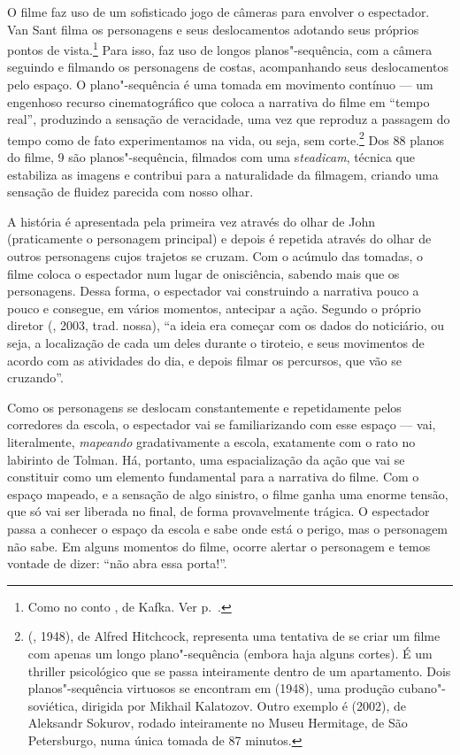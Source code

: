 O filme faz uso de um sofisticado jogo de câmeras para envolver o
espectador. Van Sant filma os personagens e seus deslocamentos adotando
seus próprios pontos de vista.\footnote{Como no conto {}, de Kafka. Ver p.~\pageref{construcao}.} Para isso, faz uso
de longos planos"-sequência, com a câmera seguindo e filmando os
personagens de costas, acompanhando seus deslocamentos pelo espaço. O
plano"-sequência é uma tomada em movimento contínuo --- um engenhoso
recurso cinematográfico que coloca a narrativa do filme em ``tempo
real'', produzindo a sensação de veracidade, uma vez que reproduz a
passagem do tempo como de fato experimentamos na vida, ou seja, sem
corte.\footnote{{} ({}, 1948), de Alfred
  Hitchcock, representa uma tentativa de se criar um filme com apenas um
  longo plano"-sequência (embora haja alguns cortes). É um
  thriller psicológico que se passa inteiramente dentro de um
  apartamento. Dois planos"-sequência virtuosos se encontram em {} (1948), uma produção cubano"-soviética, dirigida por Mikhail
  Kalatozov. Outro exemplo é {} (2002), de Aleksandr
  Sokurov, rodado inteiramente no Museu Hermitage, de São Petersburgo,
  numa única tomada de 87 minutos.} Dos 88 planos do filme, 9 são
planos"-sequência, filmados com uma s\emph{teadicam}, técnica que
estabiliza as imagens e contribui para a naturalidade da filmagem,
criando uma sensação de fluidez parecida com nosso olhar.

A história é apresentada pela primeira vez através do olhar de John
(praticamente o personagem principal) e depois é repetida através do
olhar de outros personagens cujos trajetos se cruzam. Com o acúmulo das
tomadas, o filme coloca o espectador num lugar de onisciência, sabendo
mais que os personagens. Dessa forma, o espectador vai construindo a
narrativa pouco a pouco e consegue, em vários momentos, antecipar a
ação. Segundo o próprio diretor (, 2003, trad. nossa), ``a ideia
era começar com os dados do noticiário, ou seja, a localização de cada
um deles durante o tiroteio, e seus movimentos de acordo com as
atividades do dia, e depois filmar os percursos, que vão se cruzando''.

Como os personagens se deslocam constantemente e repetidamente pelos
corredores da escola, o espectador vai se familiarizando com esse espaço
--- vai, literalmente, \emph{mapeando} gradativamente a escola,
exatamente com o rato no labirinto de Tolman. Há, portanto, uma
espacialização da ação que vai se constituir como um elemento
fundamental para a narrativa do filme. Com o espaço mapeado, e a
sensação de algo sinistro, o filme ganha uma enorme tensão, que só vai
ser liberada no final, de forma provavelmente trágica. O espectador
passa a conhecer o espaço da escola e sabe onde está o perigo, mas o
personagem não sabe. Em alguns momentos do filme, ocorre alertar o
personagem e temos vontade de dizer: ``não abra essa porta!''.

